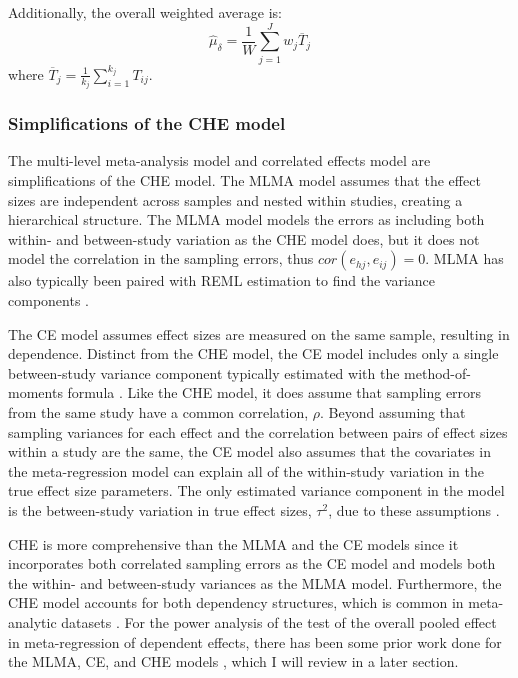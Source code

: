 Additionally, the overall weighted average is:
\begin{equation} \label{eq: CHE_mu_delta}
    \hat{\mu}_{\delta} = \frac{1}{W} \sum_{j=1}^J w_j \overline{T}_j
\end{equation}
where $\overline{T}_j = \frac{1}{k_j}\sum_{i=1}^{k_j}T_{ij}$. 


\subsubsection{Simplifications of the CHE model} 

The multi-level meta-analysis model \autocite[MLMA;][]{vandennoortgate2013, vandennoortgate2015} and correlated effects model \autocite[CE;][]{hedges2010} are simplifications of the CHE model. The MLMA model assumes that the effect sizes are independent across samples and nested within studies, creating a hierarchical structure. The MLMA model models the errors as including both within- and between-study variation as the CHE model does, but it does not model the correlation in the sampling errors, thus $cor(e_{hj}, e_{ij}) = 0$. MLMA has also typically been paired with REML estimation to find the variance components \autocite{pustejovsky2022}. 

The CE model assumes effect sizes are measured on the same sample, resulting in dependence. Distinct from the CHE model, the CE model includes only a single between-study variance component typically estimated with the method-of-moments formula \autocite{hedges2010}. Like the CHE model, it does assume that sampling errors from the same study have a common correlation, $\rho$. 
Beyond assuming that sampling variances for each effect and the correlation between pairs of effect sizes within a study are the same, the CE model also assumes that the covariates in the meta-regression model can explain all of the within-study variation in the true effect size parameters. The only estimated variance component in the model is the between-study variation in true effect sizes, $\tau^2$, due to these assumptions \autocite{pustejovsky2022}. 

CHE is more comprehensive than the MLMA and the CE models since it incorporates both correlated sampling errors as the CE model and models both the within- and between-study variances as the MLMA model. Furthermore, the CHE model accounts for both dependency structures, which is common in meta-analytic datasets \autocite{pustejovsky2022}. For the power analysis of the test of the overall pooled effect in meta-regression of dependent effects, there has been some prior work done for the MLMA, CE, and CHE models \autocite{vembye2023, vembye2024, zhang2024}, which I will review in a later section.  


